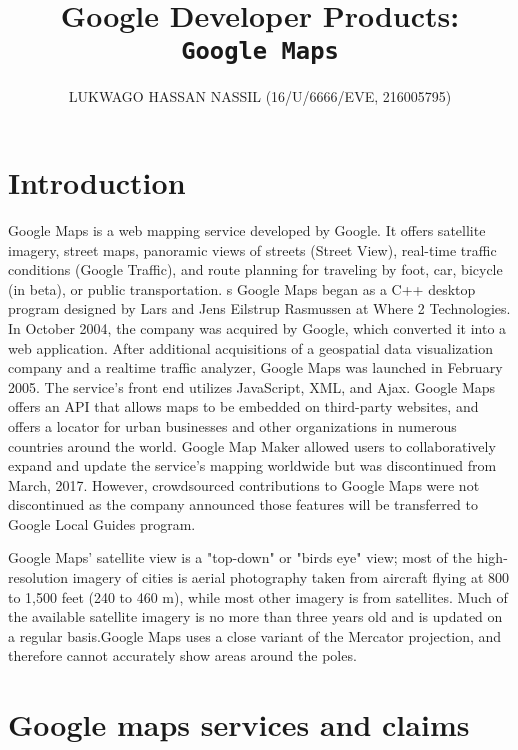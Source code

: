 \documentclass[a4paper,12pt]{article}
\title{Google Developer Products:\\
\texttt{Google Maps}}
\author{LUKWAGO HASSAN NASSIL (16/U/6666/EVE, 216005795)}
\date{}
\begin{document}
\maketitle

\section{Introduction}
Google Maps is a web mapping service developed by Google. It offers satellite imagery, street maps,  panoramic views of streets (Street View), real-time traffic conditions (Google Traffic), and route planning for traveling by foot, car, bicycle (in beta), or public transportation.
s
Google Maps began as a C++ desktop program designed by Lars and Jens Eilstrup Rasmussen at Where 2 Technologies. In October 2004, the company was acquired by Google, which converted it into a web application. After additional acquisitions of a geospatial data visualization company and a realtime traffic analyzer, Google Maps was launched in February 2005.\cite{s1} The service's front end utilizes JavaScript, XML, and Ajax. Google Maps offers an API that allows maps to be embedded on third-party websites,\cite{s2} and offers a locator for urban businesses and other organizations in numerous countries around the world. Google Map Maker allowed users to collaboratively expand and update the service's mapping worldwide but was discontinued from March, 2017. However, crowdsourced contributions to Google Maps were not discontinued as the company announced those features will be transferred to Google Local Guides program.\cite{s3}

Google Maps' satellite view is a "top-down" or "birds eye" view; most of the high-resolution imagery of cities is aerial photography taken from aircraft flying at 800 to 1,500 feet (240 to 460 m), while most other imagery is from satellites.\cite{s4} Much of the available satellite imagery is no more than three years old and is updated on a regular basis.\cite{s5}Google Maps uses a close variant of the Mercator projection, and therefore cannot accurately show areas around the poles.



\section {Google maps services and claims}
\end{document}
